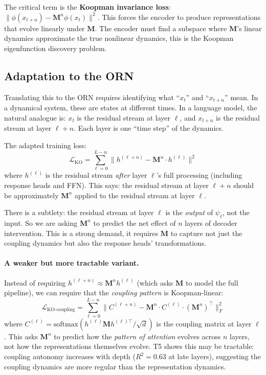 \documentclass[11pt, a4paper]{article}
\newcommand{\M}{\mathbf{M}}
\theoremstyle{plain}
\theoremstyle{remark}
\begin{document}
The critical term is the \textbf{Koopman invariance loss}: $\|\phi(x_{t+n}) - \M^n \phi(x_t)\|^2$.
This forces the encoder to produce representations that evolve linearly under $\M$.
The encoder must find a subspace where $\M$'s linear dynamics approximate the true nonlinear dynamics, this is the Koopman eigenfunction discovery problem.

\subsection{Adaptation to the ORN}

Translating this to the ORN requires identifying what ``$x_t$'' and ``$x_{t+n}$'' mean.
In a dynamical system, these are states at different times.
In a language model, the natural analogue is: $x_t$ is the residual stream at layer $\ell$, and $x_{t+n}$ is the residual stream at layer $\ell + n$.
Each layer is one ``time step'' of the dynamics.

The adapted training loss:
\begin{equation}\label{eq:koopman-orn}
    \mathcal{L}_{\text{KO}} = \sum_{\ell=0}^{L-n} \bigl\| h^{(\ell+n)} - \M^n \cdot h^{(\ell)} \bigr\|^2
\end{equation}
where $h^{(\ell)}$ is the residual stream \emph{after} layer $\ell$'s full processing (including response heads and FFN).
This says: the residual stream at layer $\ell + n$ should be approximately $\M^n$ applied to the residual stream at layer $\ell$.

There is a subtlety: the residual stream at layer $\ell$ is the \emph{output} of $\psi_\ell$, not the input.
So we are asking $\M^n$ to predict the net effect of $n$ layers of decoder intervention.
This is a strong demand, it requires $\M$ to capture not just the coupling dynamics but also the response heads' transformations.

\paragraph{A weaker but more tractable variant.}
Instead of requiring $h^{(\ell+n)} \approx \M^n h^{(\ell)}$ (which asks $\M$ to model the full pipeline), we can require that the \emph{coupling pattern} is Koopman-linear:
\begin{equation}
    \mathcal{L}_{\text{KO-coupling}} = \sum_{\ell=0}^{L-n} \bigl\| C^{(\ell+n)} - \M^n \cdot C^{(\ell)} \cdot (\M^n)^\top \bigr\|_F^2
\end{equation}
where $C^{(\ell)} = \text{softmax}(h^{(\ell)} \M h^{(\ell)\top} / \sqrt{d})$ is the coupling matrix at layer $\ell$.
This asks $\M^n$ to predict how the \emph{pattern of attention} evolves across $n$ layers, not how the representations themselves evolve.
T5 shows this may be tractable: coupling autonomy increases with depth ($R^2 = 0.63$ at late layers), suggesting the coupling dynamics are more regular than the representation dynamics.
\end{document}
